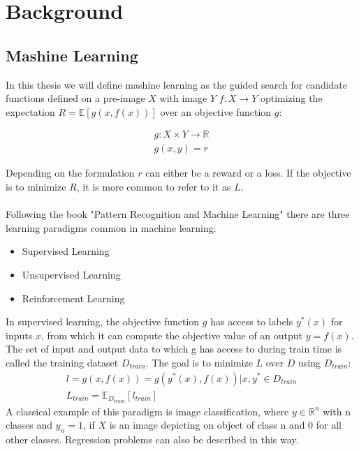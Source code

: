 
\chapter{Background}
\label{chapter:Background}
\section{Mashine Learning}
\label{section:Learning}

In this thesis we will define mashine learning as the guided search for candidate functions defined on a pre-image $X$ with image $Y$ ${f: X \rightarrow Y}$ 
optimizing the expectation ${R = \mathbb{E}\left[g(x,f(x))\right]}$ over an objective function $g$:

\begin{equation}
    \begin{aligned}
    \label{ml_eq}
    g: X \times Y \to \mathbb{R} \\
    g(x,y) = r
    \end{aligned}
\end{equation}

Depending on the formulation $r$ can either be a reward or a loss. If the objective is to minimize $R$, it is more common to refer to it as $L$.\\ \\

Following the book "Pattern Recognition and Machine Learning" \cite{bishop} there are three learning paradigms common in machine learning: 
\begin{itemize}
	\item Supervised Learning
	\item Unsupervised Learning
	\item Reinforcement Learning
\end{itemize} 

In supervised learning, the objective function $g$ has access to labels $y^*(x)$ for inputs $x$, from which it can compute the objective value of an output 
${y = f(x)}$. The set of input and output data to which g has access to during train time is called the training dataset $D_{train}$. The goal is to minimize $L$ over $D$ using 
$D_{train}$: 
\begin{equation}
    \label{supervised_paradigm}
    \begin{aligned}
        l = g(x, f(x)) = g(y^*(x), f(x)) | x, y^* \in D_{train}\\
        L_{train} = \mathbb{E}_D_{train}\left[ l_{train} \right]
    \end{aligned}
\end{equation}
A classical example of this paradigm is image classification, where $y \in \mathbb{R}^n$ with n classes and $y_n = 1$, if $X$ is an image depicting on object of class n and 0 for all other classes. 
Regression problems can also be described in this way.\\ \\

